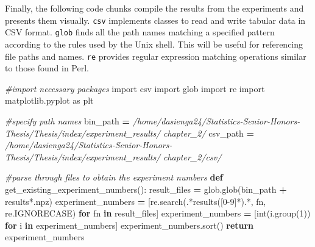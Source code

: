 \documentclass[12pt, twoside]{amherstthesis}
\newenvironment{Shaded}{\begin{snugshade}}{\end{snugshade}}
\newcommand{\BuiltInTok}[1]{#1}
\newcommand{\CommentTok}[1]{\textcolor[rgb]{0.56,0.35,0.01}{\textit{#1}}}
\newcommand{\ControlFlowTok}[1]{\textcolor[rgb]{0.13,0.29,0.53}{\textbf{#1}}}
\newcommand{\DecValTok}[1]{\textcolor[rgb]{0.00,0.00,0.81}{#1}}
\newcommand{\ImportTok}[1]{#1}
\newcommand{\KeywordTok}[1]{\textcolor[rgb]{0.13,0.29,0.53}{\textbf{#1}}}
\newcommand{\NormalTok}[1]{#1}
\newcommand{\OperatorTok}[1]{\textcolor[rgb]{0.81,0.36,0.00}{\textbf{#1}}}
\newcommand{\StringTok}[1]{\textcolor[rgb]{0.31,0.60,0.02}{#1}}
\begin{document}
\noindent Finally, the following code chunks compile the results from the experiments and presents them visually. \texttt{csv} implements classes to read and write tabular data in CSV format. \texttt{glob} finds all the path names matching a specified pattern according to the rules used by the Unix shell. This will be useful for referencing file paths and names. \texttt{re} provides regular expression matching operations similar to those found in Perl.
\begin{Shaded}
\begin{Highlighting}[]
\CommentTok{\#import necessary packages}
\ImportTok{import}\NormalTok{ csv }
\ImportTok{import}\NormalTok{ glob }
\ImportTok{import}\NormalTok{ re }
\ImportTok{import}\NormalTok{ matplotlib.pyplot }\ImportTok{as}\NormalTok{ plt }
\end{Highlighting}
\end{Shaded}
\begin{Shaded}
\begin{Highlighting}[]
\CommentTok{\#specify path names}
\NormalTok{bin\_path }\OperatorTok{=} 
\CommentTok{\textquotesingle{}/home/dasienga24/Statistics{-}Senior{-}Honors{-}Thesis/Thesis/index/experiment\_results/\textquotesingle{}}
\CommentTok{\textquotesingle{}chapter\_2/\textquotesingle{}}
\NormalTok{csv\_path }\OperatorTok{=} 
\CommentTok{\textquotesingle{}/home/dasienga24/Statistics{-}Senior{-}Honors{-}Thesis/Thesis/index/experiment\_results/\textquotesingle{}}
\CommentTok{\textquotesingle{}chapter\_2/csv/\textquotesingle{}}
\end{Highlighting}
\end{Shaded}
\begin{Shaded}
\begin{Highlighting}[]
\CommentTok{\#parse through files to obtain the experiment numbers}
\KeywordTok{def}\NormalTok{ get\_existing\_experiment\_numbers():}
\NormalTok{    result\_files       }\OperatorTok{=}\NormalTok{ glob.glob(bin\_path }\OperatorTok{+} \StringTok{\textquotesingle{}results*.npz\textquotesingle{}}\NormalTok{)}
\NormalTok{    experiment\_numbers }\OperatorTok{=}\NormalTok{ [re.search(}\StringTok{\textquotesingle{}.*results([0{-}9]*).*\textquotesingle{}}\NormalTok{, }
\NormalTok{    fn, re.IGNORECASE) }\ControlFlowTok{for}\NormalTok{ fn }\KeywordTok{in}\NormalTok{ result\_files]}
\NormalTok{    experiment\_numbers }\OperatorTok{=}\NormalTok{ [}\BuiltInTok{int}\NormalTok{(i.group(}\DecValTok{1}\NormalTok{)) }\ControlFlowTok{for}\NormalTok{ i }\KeywordTok{in}\NormalTok{ experiment\_numbers]}
\NormalTok{    experiment\_numbers.sort()}
    \ControlFlowTok{return}\NormalTok{ experiment\_numbers}
\end{Highlighting}
\end{Shaded}
\end{document}

